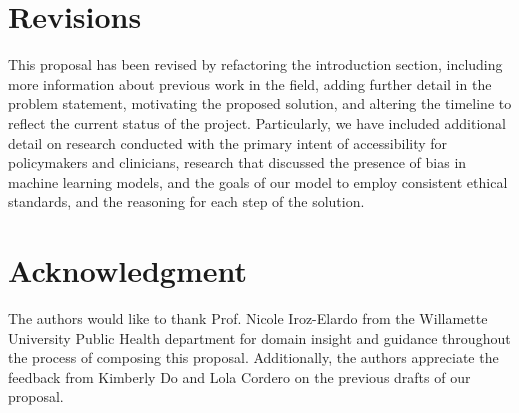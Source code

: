 \documentclass[journal]{IEEEtran}
\begin{document}
    \section*{Revisions}

    This proposal has been revised by refactoring the introduction section, including more information about previous work in the field, adding further detail in the problem statement, motivating the proposed solution, and altering the timeline to reflect the current status of the project. Particularly, we have included additional detail on research conducted with the primary intent of accessibility for policymakers and clinicians, research that discussed the presence of bias in machine learning models, and the goals of our model to employ consistent ethical standards, and the reasoning for each step of the solution.


    \section*{Acknowledgment}

    The authors would like to thank Prof. Nicole Iroz-Elardo from the Willamette University Public Health department for domain insight and guidance throughout the process of composing this proposal. Additionally, the authors appreciate the feedback from Kimberly Do and Lola Cordero on the previous drafts of our proposal.

    
    
\end{document}
